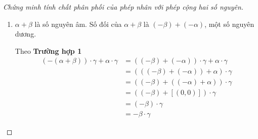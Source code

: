 \begin{proof}[Chứng minh tính chất phân phối của phép nhân với phép cộng hai số nguyên]
\begin{enumerate}[label={\textbf{Trường hợp \arabic*.}},itemindent=1.7cm]
\begin{enumerate}[label={\textbf{\alph*.}}]
\begin{align*}
                                              & = ((\alpha + \beta) + (-\beta))\cdot\gamma          & \text{(theo tính chất kết hợp của phép cộng các số nguyên)}     \\
                                              & = (\alpha + \beta)\cdot\gamma + (-\beta)\cdot\gamma & \text{(theo \textbf{Trường hợp 1})}                             \\
                                              & = (\alpha + \beta)\cdot\gamma + (-\beta\cdot\gamma) & \text{(theo Mệnh đề~\ref{proposition:sign})}
                        \end{align*}

                        Do đó
                        \begin{align*}
                            (\alpha\cdot\gamma) + (\beta\cdot\gamma) & = ((\alpha + \beta)\cdot\gamma + (-\beta\cdot\gamma)) + \beta\cdot\gamma \\
                                                                     & = (\alpha + \beta)\cdot\gamma + ((-\beta\cdot\gamma) + \beta\cdot\gamma) \\
                                                                     & = (\alpha + \beta)\cdot\gamma + [(0,0)]                                  \\
                                                                     & = (\alpha + \beta)\cdot\gamma.
                        \end{align*}
                  \item $\alpha + \beta$ là số nguyên âm. Số đối của $\alpha + \beta$ là $(-\beta) + (-\alpha)$, một số nguyên dương.

                        Theo \textbf{Trường hợp 1}
                        \begin{align*}
                            (-(\alpha + \beta))\cdot\gamma + \alpha\cdot\gamma & = ((-\beta) + (-\alpha))\cdot\gamma + \alpha\cdot\gamma \\
                                                                               & = (((-\beta) + (-\alpha)) + \alpha)\cdot\gamma          \\
                                                                               & = ((-\beta) + ((-\alpha) + \alpha))\cdot\gamma          \\
                                                                               & = ((-\beta) + [(0, 0)])\cdot\gamma                      \\
                                                                               & = (-\beta)\cdot\gamma                                   \\
                                                                               & = -\beta\cdot\gamma
                        \end{align*}


\end{enumerate}
\end{enumerate}
\end{proof}
